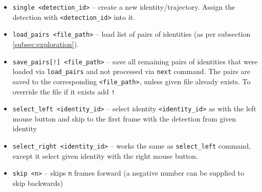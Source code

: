 \begin{itemize}
    \item \verb+single <detection_id>+ -- create a new identity/trajectory. Assign the
    detection with \verb+<detection_id>+ into it.
    \item \verb+load_pairs <file_path>+ -- load list of pairs of identities (as per subsection \ref{subsec:exploration}). 
    \item \verb+save_pairs[!] <file_path>+ -- save all remaining pairs of identities that were loaded via \verb+load_pairs+ and not processed via \verb+next+ command. The
    pairs are saved to the corresponding \verb+<file_path>+, unless given file already
    exists. To override the file if it exists add \verb+!+
    \item \verb+select_left <identity_id>+ -- select identity \verb+<identity_id>+ 
    as with the left mouse button and
    skip to the first frame with the detection from given identity
    \item \verb+select_right <identity_id>+ -- works the same as \verb+select_left+
    command, except it select given identity with the right mouse button.
    \item \verb+skip <n>+ -- skips \verb+n+ frames forward (a negative number can be supplied to skip backwards)
\end{itemize}

